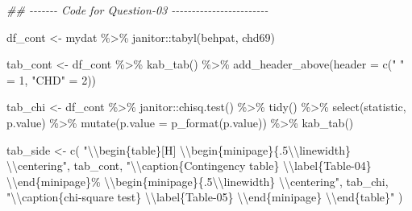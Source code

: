 \documentclass[
  12pt,
  oneside]{article}
\newenvironment{Shaded}{}{}
\newcommand{\AttributeTok}[1]{\textcolor[rgb]{0.49,0.56,0.16}{#1}}
\newcommand{\DecValTok}[1]{\textcolor[rgb]{0.25,0.63,0.44}{#1}}
\newcommand{\DocumentationTok}[1]{\textcolor[rgb]{0.73,0.13,0.13}{\textit{#1}}}
\newcommand{\FunctionTok}[1]{\textcolor[rgb]{0.02,0.16,0.49}{#1}}
\newcommand{\NormalTok}[1]{#1}
\newcommand{\OtherTok}[1]{\textcolor[rgb]{0.00,0.44,0.13}{#1}}
\newcommand{\SpecialCharTok}[1]{\textcolor[rgb]{0.25,0.44,0.63}{#1}}
\newcommand{\StringTok}[1]{\textcolor[rgb]{0.25,0.44,0.63}{#1}}
\begin{document}
\begin{Shaded}
\begin{Highlighting}[]
\DocumentationTok{\#\# {-}{-}{-}{-}{-}{-}{-} Code for Question{-}03 {-}{-}{-}{-}{-}{-}{-}{-}{-}{-}{-}{-}{-}{-}{-}{-}{-}{-}{-}{-}{-}{-}{-}{-}}

\NormalTok{df\_cont }\OtherTok{\textless{}{-}}\NormalTok{ mydat }\SpecialCharTok{\%\textgreater{}\%}\NormalTok{ janitor}\SpecialCharTok{::}\FunctionTok{tabyl}\NormalTok{(behpat, chd69)}

\NormalTok{tab\_cont }\OtherTok{\textless{}{-}}\NormalTok{ df\_cont }\SpecialCharTok{\%\textgreater{}\%}
  \FunctionTok{kab\_tab}\NormalTok{() }\SpecialCharTok{\%\textgreater{}\%}
  \FunctionTok{add\_header\_above}\NormalTok{(}\AttributeTok{header =} \FunctionTok{c}\NormalTok{(}\StringTok{" "} \OtherTok{=} \DecValTok{1}\NormalTok{, }\StringTok{"CHD"} \OtherTok{=} \DecValTok{2}\NormalTok{))}

\NormalTok{tab\_chi }\OtherTok{\textless{}{-}}\NormalTok{ df\_cont }\SpecialCharTok{\%\textgreater{}\%}
\NormalTok{  janitor}\SpecialCharTok{::}\FunctionTok{chisq.test}\NormalTok{() }\SpecialCharTok{\%\textgreater{}\%}
  \FunctionTok{tidy}\NormalTok{() }\SpecialCharTok{\%\textgreater{}\%}
  \FunctionTok{select}\NormalTok{(statistic, p.value) }\SpecialCharTok{\%\textgreater{}\%}
  \FunctionTok{mutate}\NormalTok{(}\AttributeTok{p.value =} \FunctionTok{p\_format}\NormalTok{(p.value)) }\SpecialCharTok{\%\textgreater{}\%}
  \FunctionTok{kab\_tab}\NormalTok{()}

\NormalTok{tab\_side }\OtherTok{\textless{}{-}} \FunctionTok{c}\NormalTok{(}
    \StringTok{"}\SpecialCharTok{\textbackslash{}\textbackslash{}}\StringTok{begin\{table\}[H]}
\StringTok{      }\SpecialCharTok{\textbackslash{}\textbackslash{}}\StringTok{begin\{minipage\}\{.5}\SpecialCharTok{\textbackslash{}\textbackslash{}}\StringTok{linewidth\}}
\StringTok{      }\SpecialCharTok{\textbackslash{}\textbackslash{}}\StringTok{centering"}\NormalTok{,}
\NormalTok{      tab\_cont,}
      \StringTok{"}\SpecialCharTok{\textbackslash{}\textbackslash{}}\StringTok{caption\{Contingency table\}}
\StringTok{      }\SpecialCharTok{\textbackslash{}\textbackslash{}}\StringTok{label\{Table{-}04\}}
\StringTok{    }\SpecialCharTok{\textbackslash{}\textbackslash{}}\StringTok{end\{minipage\}\%}
\StringTok{      }\SpecialCharTok{\textbackslash{}\textbackslash{}}\StringTok{begin\{minipage\}\{.5}\SpecialCharTok{\textbackslash{}\textbackslash{}}\StringTok{linewidth\}}
\StringTok{        }\SpecialCharTok{\textbackslash{}\textbackslash{}}\StringTok{centering"}\NormalTok{,}
\NormalTok{    tab\_chi,}
    \StringTok{"}\SpecialCharTok{\textbackslash{}\textbackslash{}}\StringTok{caption\{chi{-}square test\}}
\StringTok{    }\SpecialCharTok{\textbackslash{}\textbackslash{}}\StringTok{label\{Table{-}05\}}
\StringTok{    }\SpecialCharTok{\textbackslash{}\textbackslash{}}\StringTok{end\{minipage\}}
\StringTok{      }\SpecialCharTok{\textbackslash{}\textbackslash{}}\StringTok{end\{table\}"}
\NormalTok{  )}


\end{Highlighting}
\end{Shaded}
\end{document}
